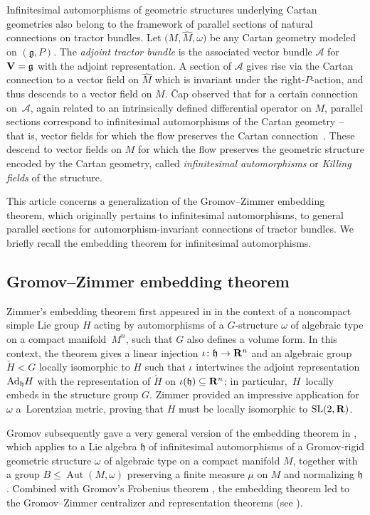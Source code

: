 \documentclass[pdftex]{sigma}
\numberwithin{equation}{section}
\theoremstyle{definition}
\newcommand{\BR}{{\bf R}}
\newcommand{\lieg}{\mathfrak{g}}
\newcommand{\lieh}{\mathfrak{h}}
\newcommand{\Aut}{\operatorname{Aut}}
\begin{document}
Infinitesimal automorphisms of geometric structures underlying Cartan geometries also belong to the framework of parallel
sections of natural connections on tractor bundles. Let $\bigl(M, \hat{M}, \omega\bigr)$ be any Cartan geometry modeled on
$(\lieg,P)$. The \emph{adjoint tractor bundle} is the associated vector
bundle $\mathcal{A}$ for ${\bf V} = \lieg$ with the adjoint
representation. A section of $\mathcal{A}$ gives rise via the Cartan
connection to a vector field on $\hat{M}$ which is invariant under the
right-$P$-action, and thus descends to a vector field on $M$.
\v{C}ap observed that for a certain connection on~$\mathcal{A}$,
again related to an intrinsically defined differential operator on $M$, parallel sections correspond to
infinitesimal automorphisms of the Cartan geometry -- that is, vector
fields for which the flow preserves the Cartan connection~\cite{cap.deformations}. These
descend to vector fields on $M$ for which the flow preserves the
geometric structure encoded by the Cartan geometry, called
\emph{infinitesimal automorphisms} or \emph{Killing fields} of the structure.

This article concerns a
generalization of the Gromov--Zimmer embedding theorem, which originally pertains to
infinitesimal automorphisms, to general parallel sections for automorphism-invariant connections of tractor bundles.
We briefly recall the embedding theorem for infinitesimal automorphisms.

\subsection{Gromov--Zimmer embedding theorem}
\label{sec.intro.embedding}

Zimmer's embedding theorem first appeared in \cite{zimmer.lorentz} in the context of a noncompact simple Lie group $H$ acting by automorphisms of a $G$-structure $\omega$ of algebraic type on a compact manifold~$M^n$, such that $G$ also defines a volume form. In this context, the theorem gives a linear injection $\iota\colon \lieh \rightarrow \BR^n$ and an algebraic group $\check{H} < G$ locally isomorphic to $H$ such that $\iota$ intertwines the adjoint representation ${\rm Ad}_\lieh H$ with the representation of $\check{H}$ on $\iota(\lieh) \subseteq \BR^n$; in particular,~$H$~locally embeds in the structure group $G$. Zimmer provided an impressive application for~$\omega$ a~Lorentzian metric, proving that $H$ must be locally isomorphic to ${\rm SL}(2,\BR)$.

Gromov subsequently gave a very general version of the embedding theorem in \cite[Theorem~5.2.A]{gromov.rgs}, which applies to a Lie algebra $\lieh$ of infinitesimal automorphisms of a Gromov-rigid geometric structure $\omega$ of algebraic type on a compact manifold $M$, together with a group $B \leq \Aut(M,\omega)$ preserving a finite measure $\mu$ on $M$ and normalizing $\lieh$. Combined with Gromov's Frobenius theorem \cite[Theorem~1.3.A]{gromov.rgs}, the embedding theorem led to the Gromov--Zimmer centralizer and representation theorems (see \cite{zimmer.gromovrep}).
\end{document}

